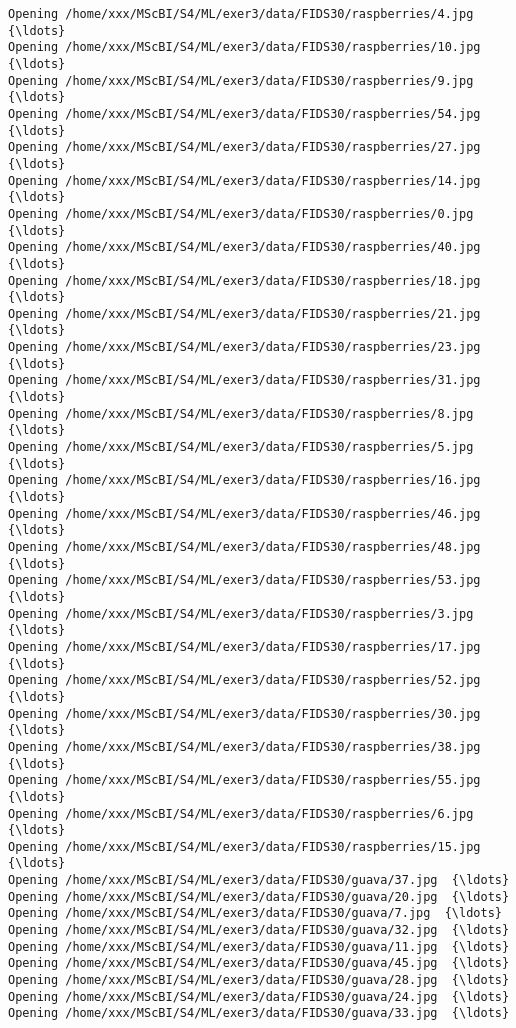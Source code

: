 \documentclass[11pt]{article}
\begin{document}
\begin{Verbatim}[commandchars=\\\{\}]
Opening /home/xxx/MScBI/S4/ML/exer3/data/FIDS30/raspberries/4.jpg  {\ldots}
Opening /home/xxx/MScBI/S4/ML/exer3/data/FIDS30/raspberries/10.jpg  {\ldots}
Opening /home/xxx/MScBI/S4/ML/exer3/data/FIDS30/raspberries/9.jpg  {\ldots}
Opening /home/xxx/MScBI/S4/ML/exer3/data/FIDS30/raspberries/54.jpg  {\ldots}
Opening /home/xxx/MScBI/S4/ML/exer3/data/FIDS30/raspberries/27.jpg  {\ldots}
Opening /home/xxx/MScBI/S4/ML/exer3/data/FIDS30/raspberries/14.jpg  {\ldots}
Opening /home/xxx/MScBI/S4/ML/exer3/data/FIDS30/raspberries/0.jpg  {\ldots}
Opening /home/xxx/MScBI/S4/ML/exer3/data/FIDS30/raspberries/40.jpg  {\ldots}
Opening /home/xxx/MScBI/S4/ML/exer3/data/FIDS30/raspberries/18.jpg  {\ldots}
Opening /home/xxx/MScBI/S4/ML/exer3/data/FIDS30/raspberries/21.jpg  {\ldots}
Opening /home/xxx/MScBI/S4/ML/exer3/data/FIDS30/raspberries/23.jpg  {\ldots}
Opening /home/xxx/MScBI/S4/ML/exer3/data/FIDS30/raspberries/31.jpg  {\ldots}
Opening /home/xxx/MScBI/S4/ML/exer3/data/FIDS30/raspberries/8.jpg  {\ldots}
Opening /home/xxx/MScBI/S4/ML/exer3/data/FIDS30/raspberries/5.jpg  {\ldots}
Opening /home/xxx/MScBI/S4/ML/exer3/data/FIDS30/raspberries/16.jpg  {\ldots}
Opening /home/xxx/MScBI/S4/ML/exer3/data/FIDS30/raspberries/46.jpg  {\ldots}
Opening /home/xxx/MScBI/S4/ML/exer3/data/FIDS30/raspberries/48.jpg  {\ldots}
Opening /home/xxx/MScBI/S4/ML/exer3/data/FIDS30/raspberries/53.jpg  {\ldots}
Opening /home/xxx/MScBI/S4/ML/exer3/data/FIDS30/raspberries/3.jpg  {\ldots}
Opening /home/xxx/MScBI/S4/ML/exer3/data/FIDS30/raspberries/17.jpg  {\ldots}
Opening /home/xxx/MScBI/S4/ML/exer3/data/FIDS30/raspberries/52.jpg  {\ldots}
Opening /home/xxx/MScBI/S4/ML/exer3/data/FIDS30/raspberries/30.jpg  {\ldots}
Opening /home/xxx/MScBI/S4/ML/exer3/data/FIDS30/raspberries/38.jpg  {\ldots}
Opening /home/xxx/MScBI/S4/ML/exer3/data/FIDS30/raspberries/55.jpg  {\ldots}
Opening /home/xxx/MScBI/S4/ML/exer3/data/FIDS30/raspberries/6.jpg  {\ldots}
Opening /home/xxx/MScBI/S4/ML/exer3/data/FIDS30/raspberries/15.jpg  {\ldots}
Opening /home/xxx/MScBI/S4/ML/exer3/data/FIDS30/guava/37.jpg  {\ldots}
Opening /home/xxx/MScBI/S4/ML/exer3/data/FIDS30/guava/20.jpg  {\ldots}
Opening /home/xxx/MScBI/S4/ML/exer3/data/FIDS30/guava/7.jpg  {\ldots}
Opening /home/xxx/MScBI/S4/ML/exer3/data/FIDS30/guava/32.jpg  {\ldots}
Opening /home/xxx/MScBI/S4/ML/exer3/data/FIDS30/guava/11.jpg  {\ldots}
Opening /home/xxx/MScBI/S4/ML/exer3/data/FIDS30/guava/45.jpg  {\ldots}
Opening /home/xxx/MScBI/S4/ML/exer3/data/FIDS30/guava/28.jpg  {\ldots}
Opening /home/xxx/MScBI/S4/ML/exer3/data/FIDS30/guava/24.jpg  {\ldots}
Opening /home/xxx/MScBI/S4/ML/exer3/data/FIDS30/guava/33.jpg  {\ldots}

\end{Verbatim}
\end{document}
